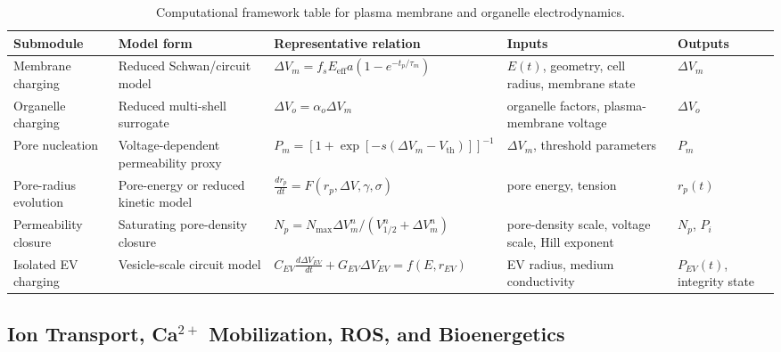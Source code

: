 \begin{table}[t]
\footnotesize\sf
\centering
\caption{Computational framework table for plasma membrane and organelle electrodynamics.\label{T_A4_comp_electrodynamics}}
\begin{tabular}{p{2.6cm} p{3.0cm} p{4.6cm} p{2.8cm} p{2.8cm}}
\toprule
\textbf{Submodule} & \textbf{Model form} & \textbf{Representative relation} & \textbf{Inputs} & \textbf{Outputs} \\
\midrule
Membrane charging & Reduced Schwan/circuit model \cite{kotnik2000analytical,joshi2000electroporation,kotnik2019membrane} & $\Delta V_m=f_sE_{\mathrm{eff}}a(1-e^{-t_p/\tau_m})$ & $E(t)$, geometry, cell radius, membrane state & $\Delta V_m$ \\
Organelle charging & Reduced multi-shell surrogate \cite{semenov2013primary,beebe2012transient,baker2024numerical} & $\Delta V_o=\alpha_o\Delta V_m$ & organelle factors, plasma-membrane voltage & $\Delta V_o$ \\
Pore nucleation & Voltage-dependent permeability proxy \cite{tieleman2004molecular,tarek2005membrane} & $P_m=[1+\exp[-s(\Delta V_m-V_{\mathrm{th}})]]^{-1}$ & $\Delta V_m$, threshold parameters & $P_m$ \\
Pore-radius evolution & Pore-energy or reduced kinetic model \cite{needham1989electro,tarek2005membrane} & $\frac{dr_p}{dt}=F(r_p,\Delta V,\gamma,\sigma)$ & pore energy, tension & $r_p(t)$ \\
Permeability closure & Saturating pore-density closure \cite{smith2004stable,krassowska2007modeling} & $N_p=N_{\max}\Delta V_m^n/(V_{1/2}^n+\Delta V_m^n)$ & pore-density scale, voltage scale, Hill exponent & $N_p$, $P_i$ \\
Isolated EV charging & Vesicle-scale circuit model \cite{singh2025electroporation,hood2014maximizing,kooijmans2013electroporation} & $C_{EV}\frac{d\Delta V_{EV}}{dt}+G_{EV}\Delta V_{EV}=f(E,r_{EV})$ & EV radius, medium conductivity & $P_{EV}(t)$, integrity state \\
\bottomrule
\end{tabular}
\end{table}

\subsection*{Ion Transport, Ca$^{2+}$ Mobilization, ROS, and Bioenergetics}

